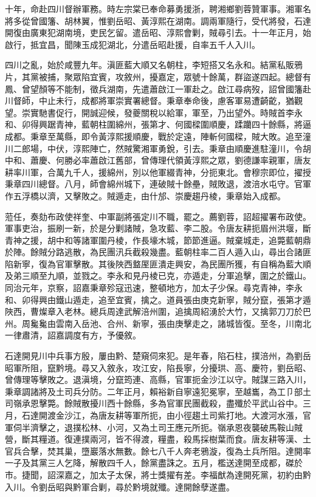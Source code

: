 \begin{pinyinscope}
十年，命赴四川督辦軍務。時左宗棠已奉命募勇援浙，聘湘鄉劉蓉贊軍事。湘軍名將多從曾國籓、胡林翼，惟劉岳昭、黃淳熙在湖南。調兩軍隨行，受代將發，石達開復由廣東犯湖南境，吏民乞留。遣岳昭、淳熙會剿，賊尋引去。十一年正月，始啟行，抵宜昌，聞陳玉成犯湖北，分遣岳昭赴援，自率五千人入川。

四川之亂，始於咸豐九年。滇匪藍大順又名朝柱，李短搭又名永和。結黨私販鴉片，其黨被捕，聚眾陷宜賓，攻敘州，擾嘉定，眾號十餘萬，群盜遂四起。總督有鳳、曾望顏等不能制，徵兵湖南，先遣蕭啟江一軍赴之。啟江尋病歿，詔曾國籓赴川督師，中止未行，成都將軍崇實署總督。秉章奉命後，慮客軍易遭齮齕，猶觀望。崇實馳書促行，開誠迎候，發夔關稅以給軍，軍至，乃出望外。時賊首李永和、卯得興踞青神，藍朝柱圍綿州，張第才、何國樑圍順慶，蹂躪四十餘縣，將逼成都。秉章至萬縣，即令黃淳熙援順慶，戰於定遠，陣斬何國樑，賊大敗。追至潼川二郎場，中伏，淳熙陣亡，然賊驚湘軍勇銳，引去。秉章由順慶進駐潼川，令胡中和、蕭慶、何勝必率蕭啟江舊部，曾傳理代領黃淳熙之眾，劉德謙率親軍，唐友耕率川軍，合萬九千人，援綿州，別以他軍綴青神，分扼東北。會穆宗即位，擢授秉章四川總督。八月，師會綿州城下，連破賊十餘壘，賊敗退，渡涪水屯守。官軍作五浮橋以濟，又擊敗之。賊遁走，由什邡、崇慶趨丹棱，秉章始入成都。

蒞任，奏劾布政使祥奎、中軍副將張定川不職，罷之。薦劉蓉，詔超擢署布政使。軍事吏治，振刷一新，於是分剿諸賊，急攻藍、李二股。令唐友耕扼眉州洪堰，斷青神之援，胡中和等諸軍圍丹棱，作長壕木城，節節進逼。賊棄城走，追斃藍朝鼎於陣。餘賊分路逃散，為民團汛兵截殺幾盡。藍朝柱率二百人遁入山，尋出合諸匪陷新寧，復為官軍擊散。其後陜西盩厔匪潰走興安，為民團所獲，有自稱為藍大順及弟三順至九順，並戮之。李永和見丹棱已克，亦遁走，分軍追擊，圍之於鐵山。同治元年，京察，詔嘉秉章殄寇迅速，整頓地方，加太子少保。尋克青神，李永和、卯得興由鐵山遁走，追至宜賓，擒之。道員張由庚克新寧，賊分竄，張第才遁陜西，曹燦章入老林。總兵周達武解涪州圍，追擒周紹湧於大竹，又擒郭刀刀於巴州。周毚毚由雲南入岳池、合州、新寧，張由庚擊走之，諸城皆復。至冬，川南北一律肅清，詔嘉調度有方，予優敘。

石達開見川中兵事方殷，屢由黔、楚窺伺來犯。是年春，陷石柱，撲涪州，為劉岳昭軍所阻，竄黔境。尋又入敘永，攻江安，陷長寧，分擾珙、高、慶符，劉岳昭、曾傳理等擊敗之。退滇境，分竄筠連、高縣，官軍扼金沙江以守。賊謀三路入川，秉章調諸將及土司兵分防。二年正月，賴裕新自寧遠犯冕寧，至越巂，為工⼙部土司嶺承恩擊斃。餘賊散擾川西十餘縣，多為官軍民團截殺，盡殲於平武山谷中。三月，石達開渡金沙江，為唐友耕等軍所扼，由小徑趨土司紫打地。大渡河水漲，官軍伺半濟擊之，退撲松林、小河，又為土司王應元所扼。嶺承恩夜襲破馬鞍山賊營，斷其糧道。復連撲兩河，皆不得渡，糧盡，殺馬採樹葉而食。唐友耕等漢、土官兵合擊，焚其巢，墮巖落水無數。餘七八千人奔老鴉漩，復為土兵所阻。達開率一子及其黨三人乞降，解散四千人，餘黨盡誅之。五月，檻送達開至成都，磔於市。捷聞，詔深嘉之，加太子太保，將士獎擢有差。李福猷為達開死黨，初約由黔入川。令劉岳昭與黔軍合剿，尋於黔境就殲。達開餘孽遂盡。


\end{pinyinscope}
